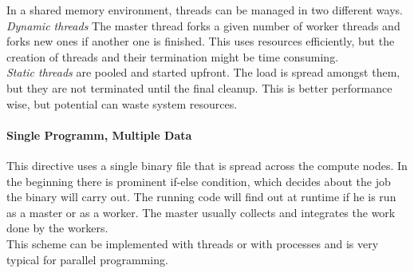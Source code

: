 \documentclass{article}
\begin{document}
	In a shared memory environment,
	threads can be managed in two different ways.
	\textsl{Dynamic threads} The master thread forks a given number of worker threads
	and forks new ones if another one is finished.
	This uses resources efficiently,
	but the creation of threads and their termination might be time consuming.\\
	\textsl{Static threads} are pooled and started upfront.
	The load is spread amongst them,
	but they are not terminated until the final cleanup.
	This is better performance wise,
	but potential can waste system resources.

\paragraph*{Single Programm, Multiple Data} %
\label{par:single_programm_multiple_data}
	This directive uses a single binary file that is spread across the compute nodes.
	In the beginning there is prominent if-else condition,
	which decides about the job the binary will carry out.
	The running code will find out at runtime if he is run as a master
	or as a worker.
	The master usually collects and integrates the work done by the workers.\\
	This scheme can be implemented with threads or with processes
	and is very typical for parallel programming.

\end{document}
